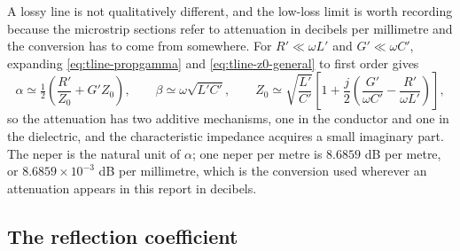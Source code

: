 A lossy line is not qualitatively different, and the low-loss limit is worth recording because the microstrip
sections refer to attenuation in decibels per millimetre and the conversion has to come from somewhere. For
$R' \ll \omega L'$ and $G' \ll \omega C'$, expanding \eqref{eq:tline-propgamma} and
\eqref{eq:tline-z0-general} to first order gives
\begin{equation}
  \alpha \simeq \tfrac12\left(\frac{R'}{Z_0} + G' Z_0\right), \qquad
  \beta \simeq \omega\sqrt{L'C'}, \qquad
  Z_0 \simeq \sqrt{\frac{L'}{C'}}\left[1 + \frac{j}{2}\left(\frac{G'}{\omega C'}
  - \frac{R'}{\omega L'}\right)\right],
  \label{eq:tline-lowloss}
\end{equation}
so the attenuation has two additive mechanisms, one in the conductor and one in the dielectric, and the
characteristic impedance acquires a small imaginary part. The neper is the natural unit of $\alpha$; one neper
per metre is $8.6859$ dB per metre, or $8.6859\times10^{-3}$ dB per millimetre, which is the conversion used
wherever an attenuation appears in this report in decibels.

\subsection{The reflection coefficient}
\label{sec:tline-gamma}

